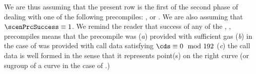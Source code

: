 \begin{center}
\end{center}
We are thus assuming that the present row is the first of the second phase of dealing with one of the following precompiles: ,  or .
We are also assuming that $\scenPrcSuccess \equiv 1$.
We remind the reader that success of any of the , ,  precompiles means that the precompile was
(\emph{a}) provided with sufficient gas
(\emph{b}) in the case of  was provided with call data satisfying $\cds \equiv 0 \mod 192$
(\emph{c}) the call data is well formed in the sense that it represents point(s) on the right curve (or sugroup of a curve in the case of .)
